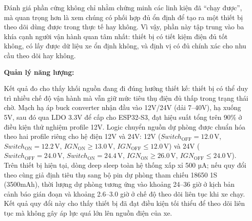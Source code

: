 \documentclass[a4paper]{extarticle}
\begin{document}
Đánh giá phần cứng không chỉ nhằm chứng minh các linh kiện đã ``chạy
được'', mà quan trọng hơn là xem chúng có phối hợp đủ ổn định để tạo ra
một thiết bị theo dõi dùng được trong thực tế hay không. Vì vậy, phần
này tập trung vào ba khía cạnh người vận hành quan tâm nhất: thiết bị có
tiết kiệm điện đủ tốt không, có lấy được dữ liệu xe ổn định không, và
định vị có đủ chính xác cho nhu cầu theo dõi hay không.

\textbf{Quản lý năng lượng:}

Kết quả đo cho thấy khối nguồn đang đi đúng hướng thiết kế: thiết bị có
thể duy trì nhiều chế độ vận hành mà vẫn giữ mức tiêu thụ điện đủ thấp
trong trạng thái chờ. Mạch hạ áp buck converter nhận đầu vào 12V/24V
(dải 7--40V), hạ xuống 5V, sau đó qua LDO 3.3V để cấp cho ESP32-S3, đạt
hiệu suất tổng trên 90\% ở điều kiện thử nghiệm profile 12V. Logic
chuyển nguồn dự phòng được chuẩn hóa theo hai profile riêng cho hệ điện
12V và 24V:
12V (\(Switch_{\mathrm{OFF}} = 12.0\,\mathrm{V}\),
\(Switch_{\mathrm{ON}} = 12.2\,\mathrm{V}\),
\(IGN_{\mathrm{ON}} \ge 13.0\,\mathrm{V}\),
\(IGN_{\mathrm{OFF}} \le 12.0\,\mathrm{V}\)) và
24V (\(Switch_{\mathrm{OFF}} = 24.0\,\mathrm{V}\),
\(Switch_{\mathrm{ON}} = 24.4\,\mathrm{V}\),
\(IGN_{\mathrm{ON}} \ge 26.0\,\mathrm{V}\),
\(IGN_{\mathrm{OFF}} \le 24.0\,\mathrm{V}\)). Trên thiết bị hiện tại, dòng deep
sleep toàn hệ thống xấp xỉ 500 µA; nếu quy đổi theo cùng giả định tiêu
thụ sang bộ pin dự phòng tham chiếu 18650 1S (3500mAh), thời lượng dự
phòng tương ứng vào khoảng 24--36 giờ ở kịch bản cảnh báo gián đoạn và
khoảng 2.6--3.0 giờ ở chế độ theo dõi liên tục khi xe chạy. Kết quả quy
đổi này cho thấy thiết bị đã đạt điều kiện tối thiểu để theo dõi liên tục
mà không gây áp lực quá lớn lên nguồn điện của xe.
\end{document}

